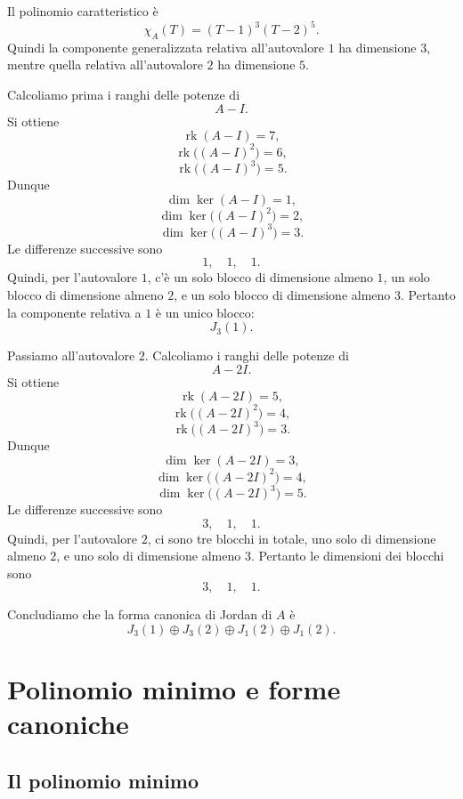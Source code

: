 \documentclass[a4paper]{article}
\begin{document}
\begin{radioactive}
\begin{snippetsolution}{}
    Il polinomio caratteristico è
    \[
        \chi_A(T)=(T-1)^3(T-2)^5.
    \]
    Quindi la componente generalizzata relativa all'autovalore \(1\) ha dimensione \(3\), mentre quella relativa all'autovalore \(2\) ha dimensione \(5\).

    Calcoliamo prima i ranghi delle potenze di
    \[
        A-I.
    \]
    Si ottiene
    \[
        \operatorname{rk}(A-I)=7,
    \]
    \[
        \operatorname{rk}\big((A-I)^2\big)=6,
    \]
    \[
        \operatorname{rk}\big((A-I)^3\big)=5.
    \]
    Dunque
    \[
        \dim\ker(A-I)=1,
    \]
    \[
        \dim\ker\big((A-I)^2\big)=2,
    \]
    \[
        \dim\ker\big((A-I)^3\big)=3.
    \]
    Le differenze successive sono
    \[
        1,\quad 1,\quad 1.
    \]
    Quindi, per l'autovalore \(1\), c'è un solo blocco di dimensione almeno \(1\), un solo blocco di dimensione almeno \(2\), e un solo blocco di dimensione almeno \(3\). Pertanto la componente relativa a \(1\) è un unico blocco:
    \[
        J_3(1).
    \]

    Passiamo all'autovalore \(2\). Calcoliamo i ranghi delle potenze di
    \[
        A-2I.
    \]
    Si ottiene
    \[
        \operatorname{rk}(A-2I)=5,
    \]
    \[
        \operatorname{rk}\big((A-2I)^2\big)=4,
    \]
    \[
        \operatorname{rk}\big((A-2I)^3\big)=3.
    \]
    Dunque
    \[
        \dim\ker(A-2I)=3,
    \]
    \[
        \dim\ker\big((A-2I)^2\big)=4,
    \]
    \[
        \dim\ker\big((A-2I)^3\big)=5.
    \]
    Le differenze successive sono
    \[
        3,\quad 1,\quad 1.
    \]
    Quindi, per l'autovalore \(2\), ci sono tre blocchi in totale, uno solo di dimensione almeno \(2\), e uno solo di dimensione almeno \(3\). Pertanto le dimensioni dei blocchi sono
    \[
        3,\quad 1,\quad 1.
    \]

    Concludiamo che la forma canonica di Jordan di \(A\) è
    \[
        J_3(1)\oplus J_3(2)\oplus J_1(2)\oplus J_1(2).
    \]
\end{snippetsolution}
\end{radioactive}

\pagebreak

\section{Polinomio minimo e forme canoniche}

\subsection{Il polinomio minimo}
\end{document}
